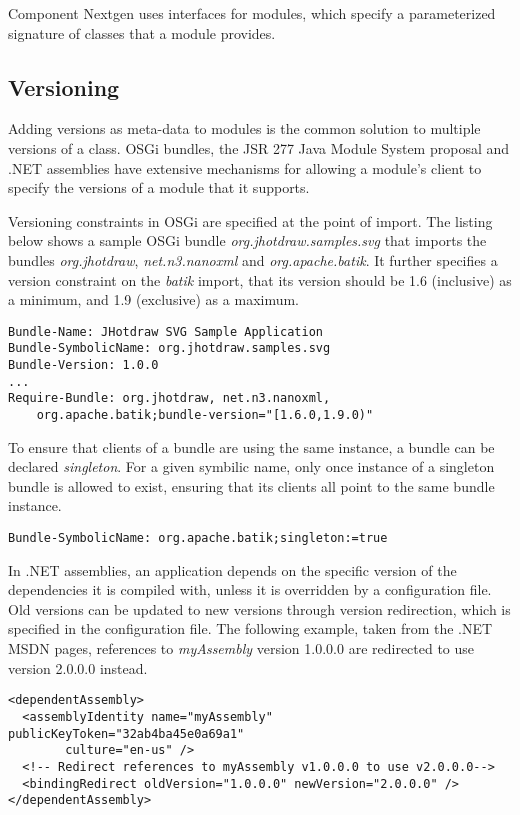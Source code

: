 Component Nextgen \cite{componentnextgen} uses interfaces for modules, which
specify a parameterized signature of classes that a module provides.

\subsection{Versioning}
Adding versions as meta-data to modules is the common solution to multiple
versions of a class. OSGi bundles, the JSR 277 Java Module System
proposal and .NET assemblies have extensive mechanisms for allowing a 
module's client to specify the versions of a module that it supports.

Versioning constraints in OSGi are specified at the point of import. The
listing below shows a sample OSGi bundle \textit{org.jhotdraw.samples.svg}
that imports the bundles \textit{org.jhotdraw}, \textit{net.n3.nanoxml} and
\textit{org.apache.batik}. It further specifies a version constraint on
the \textit{batik} import, that its version should be 1.6 (inclusive) as
a minimum, and 1.9 (exclusive) as a maximum.

\begin{lstlisting}[caption=OSGi Bundle Version Constraints]
Bundle-Name: JHotdraw SVG Sample Application
Bundle-SymbolicName: org.jhotdraw.samples.svg
Bundle-Version: 1.0.0
...
Require-Bundle: org.jhotdraw, net.n3.nanoxml,
    org.apache.batik;bundle-version="[1.6.0,1.9.0)"
\end{lstlisting}

To ensure that clients of a bundle are using the same instance, a bundle can be declared
\textit{singleton}. For a given symbilic name, only once instance of a singleton
bundle is allowed to exist, ensuring that its clients all point to the same bundle instance.

\begin{lstlisting}[caption=OSGi Singleton]
Bundle-SymbolicName: org.apache.batik;singleton:=true
\end{lstlisting}

In .NET assemblies, an application depends on the specific version of the 
dependencies it is compiled with, unless it is overridden by a configuration
file. Old versions can be updated to new versions through version redirection,
which is specified in the configuration file. The following example, taken
from the .NET MSDN pages, references to \textit{myAssembly} version 1.0.0.0
are redirected to use version 2.0.0.0 instead.

\begin{lstlisting}[caption=.NET Assemblies Version Redirection]
<dependentAssembly>
  <assemblyIdentity name="myAssembly" publicKeyToken="32ab4ba45e0a69a1" 
	   	culture="en-us" />
  <!-- Redirect references to myAssembly v1.0.0.0 to use v2.0.0.0-->
  <bindingRedirect oldVersion="1.0.0.0" newVersion="2.0.0.0" />
</dependentAssembly>
\end{lstlisting}

